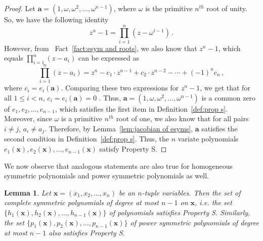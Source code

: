 \documentclass[10pt,a4paper]{article}
\newtheorem{lemma}[theorem]{Lemma}
\theoremstyle{definition}
\newcommand{\va}{\mathbf a}
\newcommand{\vx}{\mathbf x}
\begin{document}
\begin{proof}
Let $\va = (1, \omega, \omega^2, \ldots, \omega^{n-1})$, where $\omega$ is the primitive $n^{th}$ root of unity. So, we have the following identity 
\[
z^n-1 = \prod_{i=1}^{n} (z-\omega^{i-1}) \, .
 \] 
However, from ~Fact~\ref{fact:esym and roots}, we also know that $z^n - 1$, which equals $\prod_{i = 1}^n (z-a_i)$ can be expressed as
\[
\prod_{i = 1}^n (z-a_i) = z^{n} - c_1\cdot z^{n-1} + c_2\cdot z^{n-2}- \cdots + (-1)^{n} c_n \, ,
\]
where $c_i = e_i(\va)$.  
Comparing these two expressions for $z^n -1$, we get that for all $1\leq i < n$, $c_i = e_i(\va)=0$ . Thus, $\va=(1, \omega, \omega^2, \ldots, \omega^{n-1})$ is a common zero of $e_1, e_2, \ldots, e_{n-1}$, which satisfies the first item in Definition~\ref{def:prop s}. Moreover, since $\omega$ is a primitive $n^{th}$ root of one, we also know that for all pairs $i \neq j$, $a_i \neq a_j$. Therefore, by Lemma~\ref{lem:jacobian of esyms}, $\va$ satisfies the second condition in Definition~\ref{def:prop s}. Thus, the $n$ variate polynomials $e_1(\vx), e_2(\vx), \ldots, e_{n-1}(\vx)$ satisfy Property S.  
\end{proof}

%
%
%
%
%
%
%
%
%
%
%
%
%
We now observe that analogous statements are also true for homogeneous symmetric polynomials and power symmetric polynomials as well.  
\begin{lemma}\label{lem:hsym psym prop S} 
Let $\vx = (x_1, x_2, \ldots, x_n)$ be an $n$-tuple variables. Then the set of complete symmetric polynomials of degree at most $n-1$ on $\vx$, i.e. the set $\{h_1(\vx), h_2(\vx), \ldots, h_{n-1}(\vx)\}$ of polynomials satisfies Property S. Similarly, the set $\{p_1(\vx), p_2(\vx), \ldots, p_{n-1}(\vx)\}$ of power symmetric polynomials of degree at most $n-1$ also satisfies Property S.
\end{lemma}
\end{document}
